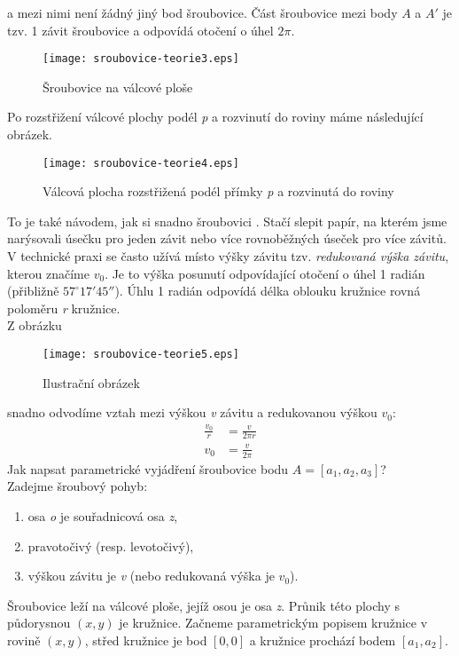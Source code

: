 a mezi nimi není žádný jiný bod šroubovice. Část šroubovice mezi body $A$ a $A'$ je tzv. 1 závit šroubovice a odpovídá otočení o
úhel $2\pi$.
\begin{figure}[H]
	\centering
	\texttt{[image: sroubovice-teorie3.eps]}
	\caption{Šroubovice na válcové ploše}
\end{figure}
\noindent{}Po rozstřižení válcové plochy podél \textit{p} a rozvinutí do roviny máme následující obrázek.
\begin{figure}[H]
	\centering
	\texttt{[image: sroubovice-teorie4.eps]}
	\caption{Válcová plocha rozstřižená podél přímky \textit{p} a rozvinutá do roviny}
\end{figure}
\noindent{}To je také návodem, jak si snadno šroubovici . Stačí slepit papír, na kterém jsme narýsovali úsečku pro jeden závit nebo více
rovnoběžných úseček pro více závitů. \\
V technické praxi se často užívá místo výšky závitu tzv. \textit{redukovaná výška závitu}, kterou značíme $v_0$. Je to výška posunutí
odpovídající otočení o úhel 1 radián (přibližně $57^{\circ}17'45''$). Úhlu 1 radián odpovídá délka oblouku kružnice rovná poloměru \textit{r} kružnice. \\
Z obrázku
\begin{figure}[H]
	\centering
	\texttt{[image: sroubovice-teorie5.eps]}
	\caption{Ilustrační obrázek}
\end{figure}
\noindent snadno odvodíme vztah mezi výškou \textit{v} závitu a redukovanou výškou $v_0$:
\begin{align*}
	\frac{v_0}{r} & = \frac{v}{2 \pi r} \\
	v_0           & = \frac{v}{2\pi}    
\end{align*}
Jak napsat parametrické vyjádření šroubovice bodu $A=[a_1, a_2, a_3]$? \\
Zadejme šroubový pohyb:
\begin{enumerate}
	\item osa \textit{o} je souřadnicová osa \textit{z},
	\item pravotočivý (resp. levotočivý),
	\item výškou závitu je \textit{v} (nebo redukovaná výška je $v_0$).
\end{enumerate}
Šroubovice leží na válcové ploše, jejíž osou je osa \textit{z}. Průnik této plochy s půdorysnou $(x, y)$ je kružnice.
Začneme parametrickým popisem kružnice v rovině $(x, y)$, střed kružnice je bod $[0,0]$ a kružnice prochází bodem $[a_1, a_2]$. \\
